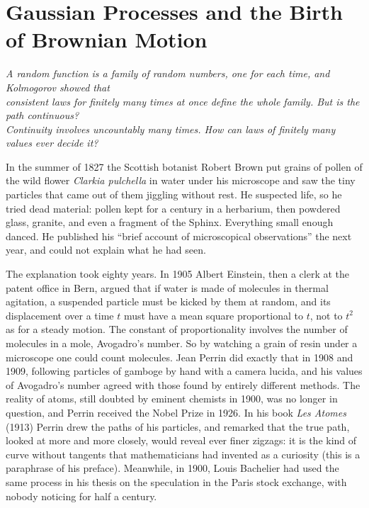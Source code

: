 \chapter{Gaussian Processes and the Birth of Brownian Motion}

\begin{center}\itshape
A random function is a family of random numbers, one for each time, and Kolmogorov showed that\\
consistent laws for finitely many times at once define the whole family. But is the path continuous?\\
Continuity involves uncountably many times. How can laws of finitely many values ever decide it?
\end{center}

In the summer of 1827 the Scottish botanist Robert Brown put grains of pollen of the wild flower \emph{Clarkia pulchella} in water under his microscope and saw
the tiny particles that came out of them jiggling without rest. He suspected life, so he tried dead material: pollen kept for a century in a herbarium, then
powdered glass, granite, and even a fragment of the Sphinx. Everything small enough danced. He published his ``brief account of microscopical observations'' the next year,
and could not explain what he had seen.

The explanation took eighty years. In 1905 Albert Einstein, then a clerk at the patent office in Bern, argued that if water is made of molecules in thermal agitation,
a suspended particle must be kicked by them at random, and its displacement over a time $t$ must have a mean square proportional to $t$, not to $t^2$ as for
a steady motion. The constant of proportionality involves the number of molecules in a mole, Avogadro's number. So by watching a grain of resin under a
microscope one could count molecules. Jean Perrin did exactly that in 1908 and 1909, following particles of gamboge by hand with a camera lucida, and his
values of Avogadro's number agreed with those found by entirely different methods. The reality of atoms, still doubted by eminent chemists in 1900, was no longer
in question, and Perrin received the Nobel Prize in 1926. In his book \emph{Les Atomes} (1913) Perrin drew the paths of his particles, and remarked that the true
path, looked at more and more closely, would reveal ever finer zigzags: it is the kind of curve without tangents that mathematicians had invented as a curiosity
(this is a paraphrase of his preface). Meanwhile, in 1900, Louis Bachelier had used the same process in his thesis on the speculation in the Paris stock
exchange, with nobody noticing for half a century.

